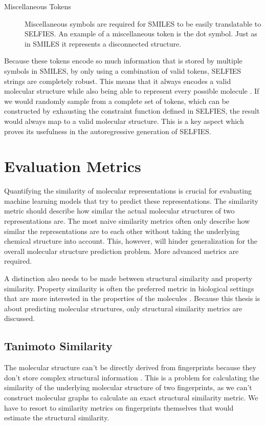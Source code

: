 \begin{description}
    \item[Miscellaneous Tokens] Miscellaneous symbols are required for SMILES to be easily translatable to SELFIES. An example of a miscellaneous token is the dot symbol. Just as in SMILES it represents a disconnected structure.
    
\end{description}

Because these tokens encode so much information that is stored by multiple symbols in SMILES, by only using a combination of valid tokens, SELFIES strings are completely robust. This means that it always encodes a valid molecular structure while also being able to represent every possible molecule \cite{lo2023recent}. If we would randomly sample from a complete set of tokens, which can be constructed by exhausting the constraint function defined in SELFIES, the result would always map to a valid molecular structure. This is a key aspect which proves its usefulness in the autoregressive generation of SELFIES.

\section{Evaluation Metrics}
\label{sec:evalmetrics}

Quantifying the similarity of molecular representations is crucial for evaluating machine learning models that try to predict these representations. The similarity metric should describe how similar the actual molecular structures of two representations are. The most naive similarity metrics often only describe how similar the representations are to each other without taking the underlying chemical structure into account. This, however, will hinder generalization for the overall molecular structure prediction problem. More advanced metrics are required.

A distinction also needs to be made between structural similarity and property similarity. Property similarity is often the preferred metric in biological settings that are more interested in the properties of the molecules \cite{safizadeh2021improving}. Because this thesis is about predicting molecular structures, only structural similarity metrics are discussed.

\subsection{Tanimoto Similarity}
\label{sec:tan_sim}

The molecular structure can't be directly derived from fingerprints because they don't store complex structural information \cite{kretschmer2023small}. This is a problem for calculating the similarity of the underlying molecular structure of two fingerprints, as we can't construct molecular graphs to calculate an exact structural similarity metric. We have to resort to similarity metrics on fingerprints themselves that would estimate the structural similarity.

